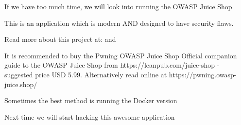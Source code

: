 \documentclass[Screen16to9,17pt]{foils}
\begin{document}

\begin{list1}
\item If we have too much time, we will look into running the OWASP Juice Shop
\item This is an application which is modern AND designed to have security flaws.
\item Read more about this project at:
 and 
\item It is recommended to buy the Pwning OWASP Juice Shop Official companion guide to the OWASP Juice Shop from https://leanpub.com/juice-shop - suggested price USD 5.99. Alternatively read online at https://pwning.owasp-juice.shop/
\item Sometimes the best method is running the Docker version
\end{list1}

\vskip 1cm
\centerline{\large Next time we will start hacking this awesome application}

\slidenext{}
\end{document}
